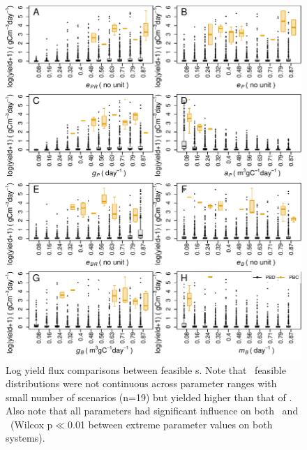 \documentclass[../thesis.tex]{subfiles} %
\begin{document}
\begin{figure}[H]
    \centering
    \includegraphics[width=\linewidth]{result/harvB.pdf}
    \caption[Log yield flux comparisons between feasible \pbs s]{Log yield flux comparisons between feasible \pbs s.  Note that \PBH\ feasible distributions were not continuous across parameter ranges with small number of scenarios (n=19) but yielded higher than that of \PBN.  Also note that all parameters had significant influence on both \PBN\ and \PBH\ (Wilcox p$\ll$0.01 between extreme parameter values on both systems).\lnExplain}
    \label{f:harvPB}
\end{figure}
\end{document}
